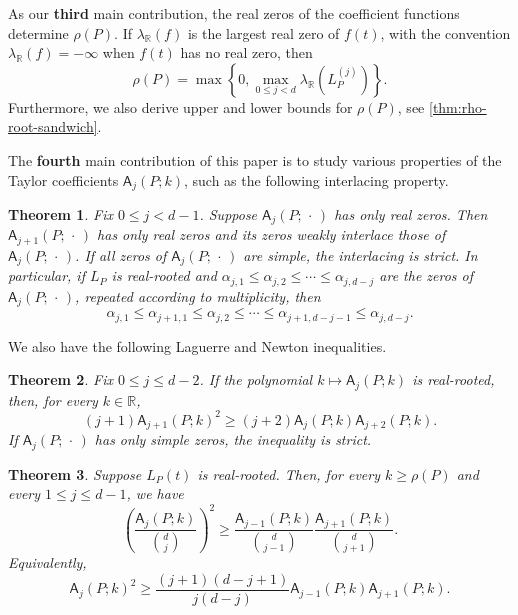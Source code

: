 \documentclass[reqno, 12pt]{article}
\numberwithin{equation}{section}
\newtheorem{theorem}{Theorem}[section]
\theoremstyle{definition}
\newcommand{\R}{\mathbb{R}}
\newcommand{\A}{\mathsf{A}}
\begin{document}
As our \textbf{third} main contribution, the real zeros of the coefficient functions determine $\rho(P)$.  
If $\lambda_{\R}(f)$ is the largest real zero of $f(t)$, with the convention $\lambda_{\R}(f)=-\infty$ when $f(t)$ has no real zero, then
\[\rho(P)=\max\left\{0,\max_{0\leq j<d}\lambda_{\R}\!\left(L_P^{(j)}\right)\right\}.
\]
Furthermore, we also derive upper and lower bounds for $\rho(P)$, see \cref{thm:rho-root-sandwich}.



The \textbf{fourth} main contribution of this paper is to study various properties of the Taylor coefficients $\A_j(P;k)$, such as the following interlacing property.
\begin{theorem}
Fix $0\leq j< d-1$.
Suppose $\A_j(P;\,\cdot\,)$ has only real zeros.  Then $\A_{j+1}(P;\,\cdot\,)$ has only real zeros and its zeros weakly
interlace those of $\A_j(P;\,\cdot\,)$.  If all zeros of $\A_j(P;\,\cdot\,)$ are simple, the interlacing is strict.
In particular, if $L_P$ is real-rooted and $\alpha_{j,1}\leq\alpha_{j,2}\leq\cdots\leq\alpha_{j,d-j}$ 
are the zeros of $\A_j(P;\,\cdot\,)$, repeated according to multiplicity, then
\[\alpha_{j,1}\leq\alpha_{j+1,1}\leq\alpha_{j,2}\leq\cdots\leq\alpha_{j+1,d-j-1}\leq\alpha_{j,d-j}.
\]
\end{theorem}

We also have the following Laguerre and Newton inequalities.
\begin{theorem}
Fix $0\leq j\leq d-2$.  If the polynomial $k\mapsto\A_j(P;k)$ is real-rooted, then, for every $k\in\R$,
\begin{equation*}
(j+1)\A_{j+1}(P;k)^2\geq(j+2)\A_j(P;k)\A_{j+2}(P;k).
\end{equation*}
If $\A_j(P;\,\cdot\,)$ has only simple zeros, the inequality is strict.
\end{theorem}

\begin{theorem}
Suppose $L_P(t)$ is real-rooted.  Then, for every $k\geq\rho(P)$ and every $1\leq j\leq d-1$, we have 
\begin{equation*}
\left(\frac{\A_j(P;k)}{\binom dj}\right)^2\geq\frac{\A_{j-1}(P;k)}{\binom d{j-1}}\frac{\A_{j+1}(P;k)}{\binom d{j+1}}.
\end{equation*}
Equivalently,
\begin{equation*}
\A_j(P;k)^2\geq\frac{(j+1)(d-j+1)}{j(d-j)}\A_{j-1}(P;k)\A_{j+1}(P;k).
\end{equation*}
\end{theorem}
\end{document}
